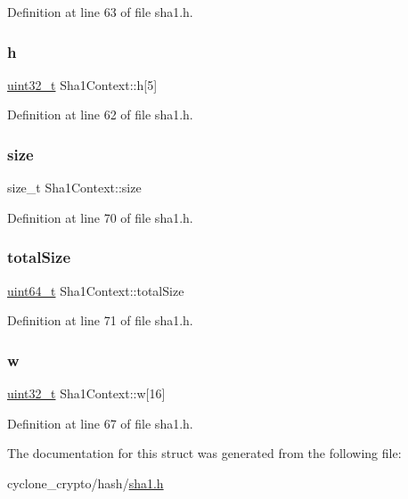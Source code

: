 Definition at line 63 of file sha1.\+h.

\mbox{\label{structSha1Context_ad496e1d37d9ec42928f8fde91b713b9c}} 
\subsubsection{\texorpdfstring{h}{h}}
{\footnotesize\ttfamily \hyperlink{stdint_8h_a435d1572bf3f880d55459d9805097f62}{uint32\+\_\+t} Sha1\+Context\+::h\mbox{[}5\mbox{]}}



Definition at line 62 of file sha1.\+h.

\mbox{\label{structSha1Context_a62278ac66e3da4e73e4e5350d228f95d}} 
\subsubsection{\texorpdfstring{size}{size}}
{\footnotesize\ttfamily size\+\_\+t Sha1\+Context\+::size}



Definition at line 70 of file sha1.\+h.

\mbox{\label{structSha1Context_a6f61345a25396a4018b726d943ebf6b2}} 
\subsubsection{\texorpdfstring{total\+Size}{totalSize}}
{\footnotesize\ttfamily \hyperlink{stdint_8h_aec6fcb673ff035718c238c8c9d544c47}{uint64\+\_\+t} Sha1\+Context\+::total\+Size}



Definition at line 71 of file sha1.\+h.

\mbox{\label{structSha1Context_aba54cc9a68a11b1b2c45c6d7f29d221e}} 
\subsubsection{\texorpdfstring{w}{w}}
{\footnotesize\ttfamily \hyperlink{stdint_8h_a435d1572bf3f880d55459d9805097f62}{uint32\+\_\+t} Sha1\+Context\+::w\mbox{[}16\mbox{]}}



Definition at line 67 of file sha1.\+h.



The documentation for this struct was generated from the following file\+:\begin{DoxyCompactItemize}
\item 
cyclone\+\_\+crypto/hash/\hyperlink{sha1_8h}{sha1.\+h}\end{DoxyCompactItemize}
